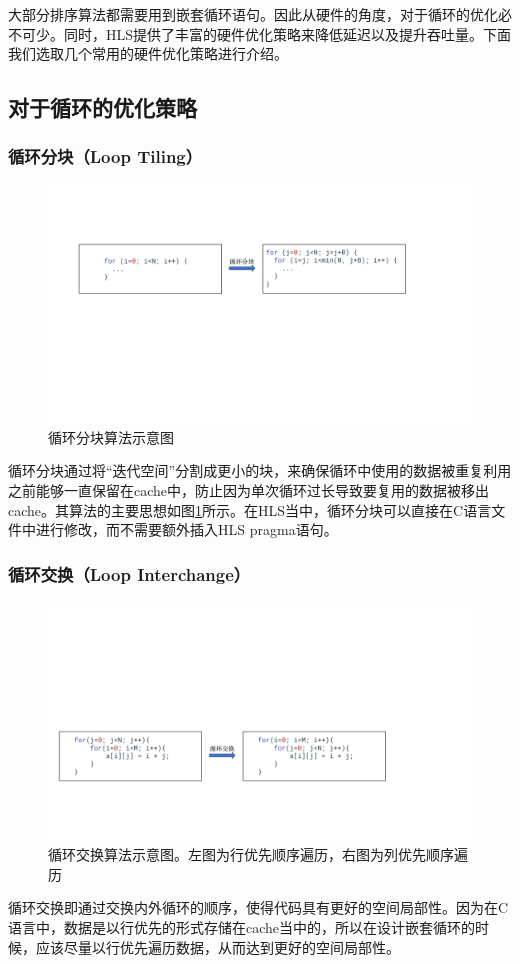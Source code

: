 大部分排序算法都需要用到嵌套循环语句。因此从硬件的角度，对于循环的优化必不可少。同时，HLS提供了丰富的硬件优化策略来降低延迟以及提升吞吐量。下面我们选取几个常用的硬件优化策略进行介绍。

\subsection{对于循环的优化策略}
\subsubsection{循环分块（Loop Tiling）}
\begin{figure}[htbp]
    \centering
    \includegraphics[width=\linewidth]{figures/loop tiling.pdf}
    \caption{循环分块算法示意图}
    \label{fig:loop_tiling}
\end{figure}

循环分块通过将“迭代空间”分割成更小的块，来确保循环中使用的数据被重复利用之前能够一直保留在cache中，防止因为单次循环过长导致要复用的数据被移出cache。其算法的主要思想如图\ref{fig:loop_tiling}所示。在HLS当中，循环分块可以直接在C语言文件中进行修改，而不需要额外插入HLS pragma语句。


\subsubsection{循环交换（Loop Interchange）}
\begin{figure}[htbp]
    \centering
    \includegraphics[width=\linewidth]{figures/loop interchange.pdf}
    \caption{循环交换算法示意图。左图为行优先顺序遍历，右图为列优先顺序遍历}
    \label{fig:loop_interchange}
\end{figure}
循环交换即通过交换内外循环的顺序，使得代码具有更好的空间局部性。因为在C语言中，数据是以行优先的形式存储在cache当中的，所以在设计嵌套循环的时候，应该尽量以行优先遍历数据，从而达到更好的空间局部性。
